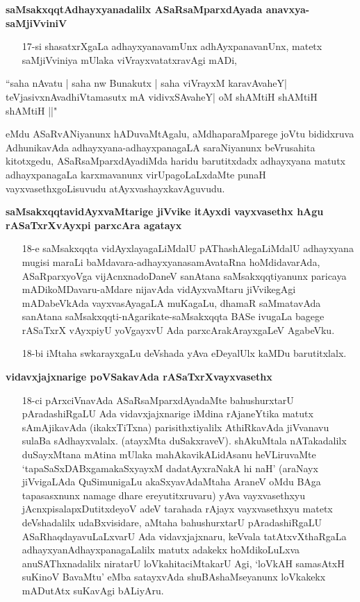 \noindent
\textbf{saMsakxqqtAdhayxyanadalilx ASaRsaMparxdAyada anavxya-saMjiVviniV}\label{page45}

\begin{itemize}
\item[17-si] shasatxrXgaLa adhayxyanavamUnx adhAyxpanavanUnx, matetx saMjiVviniya mUlaka viVrayxvatatxravAgi mADi,
\end{itemize}

\begin{shloka}
``saha nAvatu | saha nw Bunakutx | saha viVrayxM karavAvaheY|\\\label{46}
teVjasivxnAvadhiVtamasutx mA vidivxSAvaheY| oM shAMtiH shAMtiH shAMtiH ||"
\end{shloka}

eMdu ASaRvANiyanunx hADuvaMtAgalu, aMdhaparaMparege joVtu bididxruva AdhunikavAda adhayxyana-adhayxpanagaLA saraNiyanunx beVrusahita kitotxgedu, ASaRsaMparxdAyadiMda haridu barutitxdadx adhayxyana matutx adhayxpanagaLa karxmavanunx virUpagoLaLxdaMte punaH vayxvasethxgoLisuvudu atAyxvashayxkavAguvudu.

\noindent
\textbf{saMsakxqqtavidAyxvaMtarige jiVvike itAyxdi vayxvasethx hAgu rASaTxrXvAyxpi parxcAra agatayx}\label{page46}

\begin{itemize}
\item[18-e] saMsakxqqta vidAyxlayagaLiMdalU pAThashAlegaLiMdalU adhayxyana mugisi maraLi baMdavara-adhayxyanasamAvataRna hoMdidavarAda, ASaRparxyoVga vijAcnxnadoDaneV sanAtana saMsakxqqtiyanunx paricaya mADikoMDavaru-aMdare nijavAda vidAyxvaMtaru jiVvikegAgi mADabeVkAda vayxvasAyagaLA muKagaLu, dhamaR saMmatavAda sanAtana saMsakxqqti-nAgarikate-saMsakxqqta BASe ivugaLa bagege rASaTxrX vAyxpiyU yoVgayxvU Ada parxcArakArayxgaLeV AgabeVku.

\item[18-bi] iMtaha swkarayxgaLu deVshada yAva eDeyalUlx kaMDu barutitxlalx.
\end{itemize}

\noindent
\textbf{vidavxjajxnarige poVSakavAda rASaTxrXvayxvasethx}\label{page46}

\begin{itemize}
\item[18-ci] pArxciVnavAda ASaRsaMparxdAyadaMte bahushurxtarU pAradashiRgaLU Ada vidavxjajxnarige iMdina rAjaneYtika matutx sAmAjikavAda (ikakxTiTxna) parisithxtiyalilx AthiRkavAda jiVvanavu sulaBa sAdhayxvalalx. (atayxMta duSakxraveV). shAkuMtala nATakadalilx duSayxMtana mAtina mUlaka mahAkavikALidAsanu heVLiruvaMte `tapaSaSxDABxgamakaSxyayxM\label{46} dadatAyxraNakA hi naH' (araNayx jiVvigaLAda QuSimunigaLu akaSxyavAdaMtaha AraneV oMdu BAga tapasasxnunx namage dhare ereyutitxruvaru) yAva vayxvasethxyu jAcnxpisalapxDutitxdeyoV adeV tarahada rAjayx vayxvasethxyu matetx deVshadalilx udaBxvisidare, aMtaha bahushurxtarU pAradashiRgaLU ASaRhaqdayavuLaLxvarU Ada vidavxjajxnaru, keVvala tatAtxvXthaRgaLa adhayxyanAdhayxpanagaLalilx matutx adakekx hoMdikoLuLxva anuSAThxnadalilx niratarU loVkahitaciMtakarU Agi, `loVkAH samasAtxH suKinoV BavaMtu'\label{47} eMba satayxvAda shuBAshaMseyanunx loVkakekx mADutAtx suKavAgi bALiyAru.
\end{itemize}

